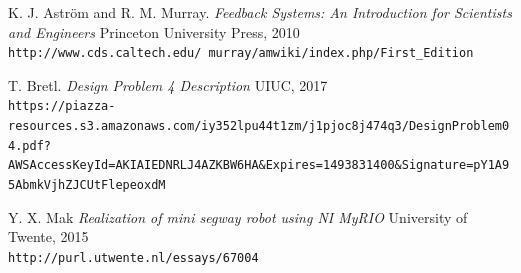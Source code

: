 \documentclass[12pt]{article}
\begin{document}
\clearpage
\begin{thebibliography}{9}

K. J. Astr{\"o}m and R. M. Murray.
\textit{Feedback Systems: An Introduction for Scientists and Engineers}
Princeton University Press, 2010
\\\texttt{http://www.cds.caltech.edu/~murray/amwiki/index.php/First_Edition}
	
T. Bretl.
\textit{Design Problem 4 Description}
UIUC, 2017
\\\texttt{https://piazza-resources.s3.amazonaws.com/iy352lpu44t1zm/j1pjoc8j474q3/DesignProblem04.pdf?AWSAccessKeyId=AKIAIEDNRLJ4AZKBW6HA&Expires=1493831400&Signature=pY1A95AbmkVjhZJCUtFlepeoxdM}

Y. X. Mak
\textit{Realization of mini segway robot using NI MyRIO}
University of Twente, 2015
\\\texttt{http://purl.utwente.nl/essays/67004}

\end{thebibliography}

\end{document}
